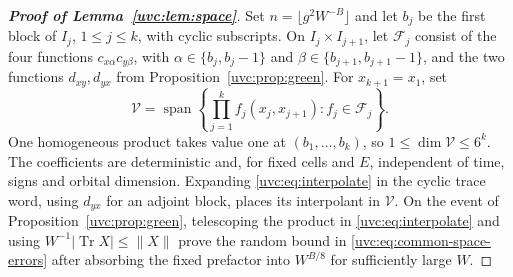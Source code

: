 \documentclass[11pt]{article}
\numberwithin{equation}{section}
\theoremstyle{remark}
\newcommand{\Tr}{\operatorname{Tr}}
\begin{document}
\begin{proof}[\textbf{Proof of Lemma~\ref{uvc:lem:space}}]
Set $n=\lfloor g^2W^{-B}\rfloor$ and let $b_j$ be the first block of
$I_j$, $1\le j\le k$, with cyclic subscripts.
On $I_j\times I_{j+1}$, let $\mathcal F_j$ consist of the four functions
$c_{x\alpha}c_{y\beta}$, with
$\alpha\in\{b_j,b_j-1\}$ and $\beta\in\{b_{j+1},b_{j+1}-1\}$,
and the two functions $d_{xy},d_{yx}$ from Proposition~\ref{uvc:prop:green}.
For $x_{k+1}=x_1$, set
\[
 \mathcal V=\operatorname{span}\left\{
   \prod_{j=1}^k f_j(x_j,x_{j+1}):f_j\in\mathcal F_j\right\}.
\]
One homogeneous product takes value one at $(b_1,\ldots,b_k)$,
so $1\le\dim\mathcal V\le6^k$.
The coefficients are deterministic and, for fixed cells and $E$,
independent of time, signs and orbital dimension.
Expanding \eqref{uvc:eq:interpolate} in the cyclic trace word, using
$d_{yx}$ for an adjoint block, places its interpolant in $\mathcal V$.
On the event of
Proposition~\ref{uvc:prop:green}, telescoping the product in
\eqref{uvc:eq:interpolate} and using $W^{-1}|\Tr X|\le\|X\|$
prove the random bound in \eqref{uvc:eq:common-space-errors} after
absorbing the fixed prefactor into $W^{B/8}$ for sufficiently large $W$.


\end{proof}
\end{document}
